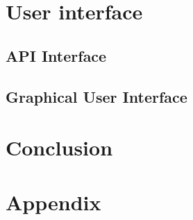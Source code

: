 \documentclass{article}
\begin{document}
\section{User interface}
\subsection{API Interface}
\subsection{Graphical User Interface}

\section{Conclusion}

\section{Appendix}
\end{document}
